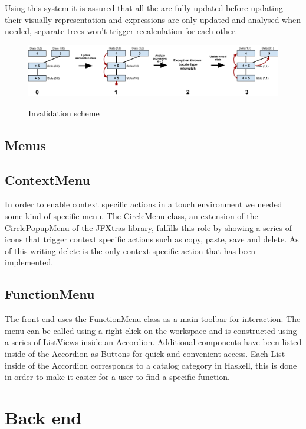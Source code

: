 Using this system it is assured that all the  are fully updated before updating their visually representation and expressions are only updated and analysed when needed, separate trees won't trigger recalculation for each other.

\begin{figure}[h]
	\centering
	\includegraphics[scale=0.23]{Images/invalidation}
	\label{fig:invalidation}
	\caption{Invalidation scheme}
\end{figure}

\subsection{Menus}

\subsection{ContextMenu}

In order to enable context specific actions in a touch environment we needed some kind of specific menu.
The CircleMenu class, an extension of the CirclePopupMenu of the JFXtras library, fulfills this role by showing a series of icons that trigger context specific actions such as copy, paste, save and delete.
As of this writing delete is the only context specific action that has been implemented.

\subsection{FunctionMenu}

The front end uses the FunctionMenu class as a main toolbar for interaction.
The menu can be called using a right click on the workspace and is constructed using a series of ListViews inside an Accordion.
Additional components have been listed inside of the Accordion as Buttons for quick and convenient access.
Each List inside of the Accordion corresponds to a catalog category in Haskell, this is done in order to make it easier for a user
to find a specific function.

\section{Back end}

